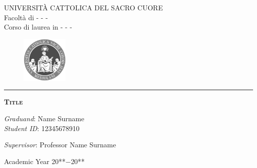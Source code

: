 
\pagestyle{empty}

\vspace*{-1.5cm}

\begin{center}
\large
UNIVERSIT\`{A} CATTOLICA DEL SACRO CUORE \\
\normalsize
Facoltà di - - - \\
Corso di laurea in - - - \\

\begin{figure}[H]
  \centering
	\includegraphics[width=2.25cm]{Logo-mono.png}
  \end{figure}
\vspace*{-0.6cm}
\noindent\rule{4cm}{0.2pt}
\vspace*{2cm}
  
\huge{\textbf{\textsc{Title}}}

\vspace*{.75truecm}
\end{center}

\vfill
\vfill

\large

\begin{flushright}
\emph{Graduand}: Name Surname \\
\emph{Student ID}: 12345678910 \\
\end{flushright}

\noindent \emph{Supervisor}: Professor Name Surname \\



\vfill
\vfill

\begin{center}
  Academic Year 20**$-$20**
\end{center}
